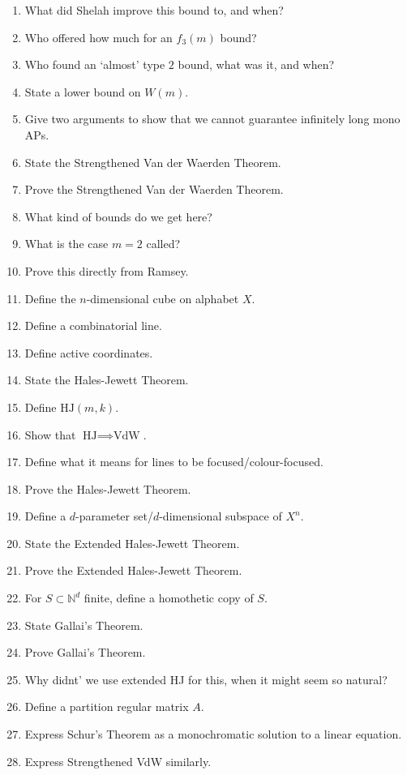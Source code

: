 \documentclass[10pt]{article}
\newcommand{\bb}[1]{\mathbb{#1}}
\newcommand{\N}{\bb{N}}
\newcommand{\hj}{\textrm{HJ}}
\newcommand{\vdw}{\textrm{VdW}}
\begin{document}
\begin{enumerate}
    \item What did Shelah improve this bound to, and when?
    \item Who offered how much for an $f_3(m)$ bound?
    \item Who found an `almost' type $2$ bound, what was it, and when?
    \item State a lower bound on $W(m)$.
    \item Give two arguments to show that we cannot guarantee infinitely long mono APs.
    \item State the Strengthened Van der Waerden Theorem.
    \item Prove the Strengthened Van der Waerden Theorem.
    \item What kind of bounds do we get here?
    \item What is the case $m = 2$ called?
    \item Prove this directly from Ramsey.
    \item Define the $n$-dimensional cube on alphabet $X$.
    \item Define a combinatorial line.
    \item Define active coordinates.
    \item State the Hales-Jewett Theorem.
    \item Define $\hj(m,k)$.
    \item Show that $\hj \implies \vdw$.
    \item Define what it means for lines to be focused/colour-focused.
    \item Prove the Hales-Jewett Theorem.
    \item Define a $d$-parameter set/$d$-dimensional subspace of $X^n$.
    \item State the Extended Hales-Jewett Theorem.
    \item Prove the Extended Hales-Jewett Theorem.
    \item For $S\subset \N^d$ finite, define a homothetic copy of $S$.
    \item State Gallai's Theorem.
    \item Prove Gallai's Theorem.
    \item Why didnt' we use extended HJ for this, when it might seem so natural?
    \item Define a partition regular matrix $A$.
    \item Express Schur's Theorem as a monochromatic solution to a linear equation.
    \item Express Strengthened VdW similarly.

\end{enumerate}
\end{document}
